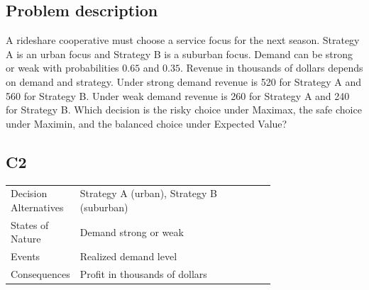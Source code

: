 \begin{ExamProblems}
			\item
			\subsection*{Problem description}
			A rideshare cooperative must choose a service focus for the next season. Strategy A is an urban focus and Strategy B is a suburban focus. Demand can be strong or weak with probabilities $0.65$ and $0.35$. Revenue in thousands of dollars depends on demand and strategy. Under strong demand revenue is 520 for Strategy A and 560 for Strategy B. Under weak demand revenue is 260 for Strategy A and 240 for Strategy B. Which decision is the risky choice under Maximax, the safe choice under Maximin, and the balanced choice under Expected Value?

		\subsection*{C2}
		\begin{center}
			\begin{tabular}{l p{0.74\linewidth}}
				\toprule
				Decision Alternatives & Strategy A (urban), Strategy B (suburban) \\
				States of Nature & Demand strong or weak \\
				Events & Realized demand level \\
				Consequences & Profit in thousands of dollars \\
				\bottomrule
			\end{tabular}
		\end{center}


\end{ExamProblems}
